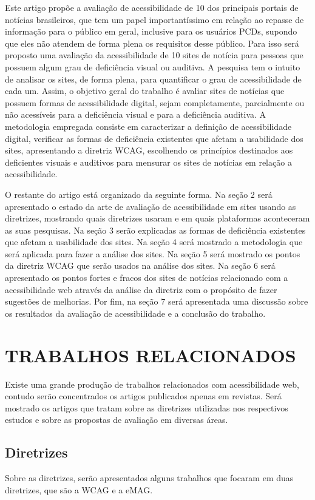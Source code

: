 \documentclass[a4paper]{article}
\begin{document}
\begin{titlepage}
Este artigo propõe a avaliação de acessibilidade de 10 dos principais portais de notícias brasileiros, que tem um papel importantíssimo em relação ao repasse de informação para o público em geral, inclusive para os usuários PCDs, supondo que eles não atendem de forma plena os requisitos desse público. Para isso será proposto uma avaliação da acessibilidade de 10 sites de notícia para pessoas que possuem algum grau de deficiência visual ou auditiva. A pesquisa tem o intuito de analisar os sites, de forma plena, para quantificar o grau de acessibilidade de cada um. Assim, o objetivo geral do trabalho é avaliar sites de notícias que possuem formas de acessibilidade digital, sejam completamente, parcialmente ou não acessíveis para a deficiência visual e para a deficiência auditiva. A metodologia empregada consiste em caracterizar a definição de acessibilidade digital, verificar as formas de deficiência existentes que afetam a usabilidade dos sites, apresentando a diretriz WCAG, escolhendo os princípios destinados aos deficientes visuais e auditivos para mensurar os sites de notícias em relação a acessibilidade.

O restante do artigo está organizado da seguinte forma.
Na seção 2 será apresentado o estado da arte de avaliação de acessibilidade em sites usando as diretrizes, mostrando quais diretrizes usaram e em quais plataformas aconteceram as suas pesquisas.
Na seção 3 serão explicadas as formas de deficiência existentes que afetam a usabilidade dos sites.
Na seção 4 será mostrado a metodologia que será aplicada para fazer a análise dos sites.
Na seção 5 será mostrado os pontos da diretriz WCAG que serão usados na análise dos sites.
Na seção 6 será apresentado os pontos fortes e fracos dos sites de notícias relacionado com a acessibilidade web através da análise da diretriz com o propósito de fazer sugestões de melhorias.
Por fim, na seção 7 será apresentada uma discussão sobre os resultados da avaliação de acessibilidade e a conclusão do trabalho.

\section{TRABALHOS RELACIONADOS}
Existe uma grande produção de trabalhos relacionados com acessibilidade web, contudo serão concentrados os artigos publicados apenas em revistas. Será mostrado os artigos que tratam sobre as diretrizes utilizadas nos respectivos estudos e sobre as propostas de avaliação em diversas áreas.

\subsection{Diretrizes}
Sobre as diretrizes, serão apresentados alguns trabalhos que focaram em duas diretrizes, que são a WCAG e a eMAG.


\end{titlepage}
\end{document}
